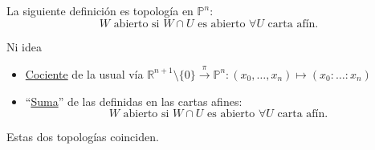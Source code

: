 \begin{prop}
La siguiente definición es topología en $\mathbb{P}^n$:
\[
W \text{ abierto si } W \cap U \text{ es abierto } \forall U \text{ carta afín.}
\]
\end{prop}
\begin{demo}
Ni idea
\end{demo}

\begin{prop}[Topología en Pn]    
\begin{itemize}
    \item \underline{Cociente} de la usual vía $\mathbb{R}^{n+1}\setminus \{0\} \xrightarrow{\pi} \mathbb{P}^{n}: \left( x_0, \ldots, x_n \right) \mapsto \left( x_0 : \ldots : x_n \right)$
    \item ``\underline{Suma}'' de las definidas en las cartas afines:
    \[
        W \text{ abierto si } W \cap U \text{ es abierto } \forall U \text{ carta afín.} 
    \]
\end{itemize}
Estas dos topologías coinciden.
\end{prop}
